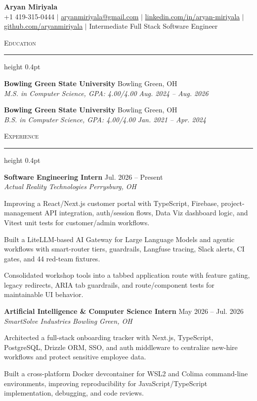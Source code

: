 \documentclass[letterpaper,11pt]{article}
\newcommand{\resumesection}[1]{%
  \par\vspace{2pt}%
  {\large\scshape #1}\par\vspace{2pt}%
  \hrule height 0.4pt\vspace{2pt}%
}
\newcommand{\resumeSubheading}[4]{
  \textbf{#1} \hfill #2\\
  \textit{#3} \hfill \textit{#4}
}
\begin{document}
\begin{center}
  {\LARGE \textbf{Aryan Miriyala}}\\[-1pt]
  \small
  +1 419-315-0444 $|$
  \href{mailto:aryanmiriyala@gmail.com}{aryanmiriyala@gmail.com} $|$
  \href{https://www.linkedin.com/in/aryan-miriyala-7788a21b6/}{linkedin.com/in/aryan-miriyala} $|$
  \href{https://github.com/aryanmiriyala}{github.com/aryanmiriyala} $|$
  Intermediate Full Stack Software Engineer
\end{center}\vspace{-10pt}

\resumesection{Education}
\resumeSubheading
{Bowling Green State University}{Bowling Green, OH}
{M.S. in Computer Science, GPA: 4.00/4.00}{Aug. 2024 -- Aug. 2026}

\resumeSubheading
{Bowling Green State University}{Bowling Green, OH}
{B.S. in Computer Science, GPA: 4.00/4.00}{Jan. 2021 -- Apr. 2024}

\resumesection{Experience}
\resumeSubheading
{Software Engineering Intern}{Jul. 2026 -- Present}
{Actual Reality Technologies}{Perrysburg, OH}
\begin{tightitemize}
  \item Improving a React/Next.js customer portal with TypeScript, Firebase, project-management API integration, auth/session flows, Data Viz dashboard logic, and Vitest unit tests for customer/admin workflows.
  \item Built a LiteLLM-based AI Gateway for Large Language Models and agentic workflows with smart-router tiers, guardrails, Langfuse tracing, Slack alerts, CI gates, and 44 red-team fixtures.
  \item Consolidated workshop tools into a tabbed application route with feature gating, legacy redirects, ARIA tab guardrails, and route/component tests for maintainable UI behavior.
\end{tightitemize}

\resumeSubheading
{Artificial Intelligence \& Computer Science Intern}{May 2026 -- Jul. 2026}
{SmartSolve Industries}{Bowling Green, OH}
\begin{tightitemize}
  \item Architected a full-stack onboarding tracker with Next.js, TypeScript, PostgreSQL, Drizzle ORM, SSO, and auth middleware to centralize new-hire workflows and protect sensitive employee data.
  \item Built a cross-platform Docker devcontainer for WSL2 and Colima command-line environments, improving reproducibility for JavaScript/TypeScript implementation, debugging, and code reviews.
\end{tightitemize}
\end{document}
